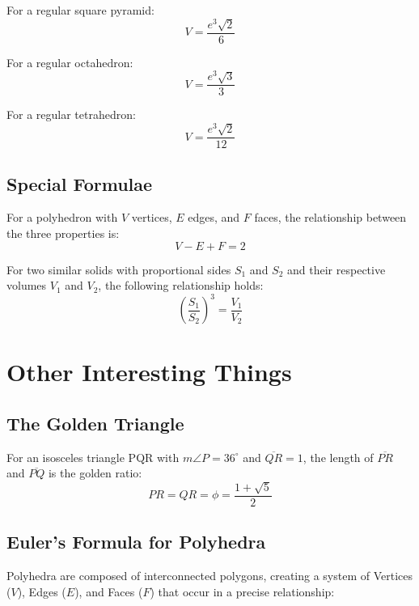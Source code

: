 \documentclass[final, letterpaper, 12pt]{article}
\begin{document}
		For a regular square pyramid:
		\begin{equation}
			V = \frac{e^3\sqrt{2}}{6}
		\end{equation}
		
		For a regular octahedron:
		\begin{equation}
			V = \frac{e^3\sqrt{3}}{3}
		\end{equation}
		
		For a regular tetrahedron:
		\begin{equation}
			V = \frac{e^3\sqrt{2}}{12}
		\end{equation}
	\subsection{Special Formulae}\label{sec: euler's formula for polyhedra and solid similarity}
		For a polyhedron with $V$ vertices, $E$ edges, and $F$ faces, the relationship between the three properties is:
		\begin{equation}
			V - E + F = 2
		\end{equation}
		
		For two similar solids with proportional sides $S_1$ and $S_2$ and their respective volumes $V_1$ and $V_2$, the following relationship holds:
		\begin{equation}
			\left( \frac{S_1}{S_2} \right) ^3 = \frac{V_1}{V_2}
		\end{equation}
		
\section{Other Interesting Things}
	\subsection{The Golden Triangle}\label{sec: 36-72-72 triangle and value of phi}
	For an isosceles triangle PQR with $m\angle P = 36 ^{\circ}$ and $\overline{QR} = 1$, the length of $\overline{PR}$ and $\overline{PQ}$ is the golden ratio:
		\begin{equation}
			PR = QR = \phi = \frac{1 + \sqrt{5}}{2}
		\end{equation}
	
	\subsection{Euler's Formula for Polyhedra}\label{sec: a relationship between vertices, edges, and faces in polyhedra}
		Polyhedra are composed of interconnected polygons, creating a system of Vertices ($V$), Edges ($E$), and Faces ($F$) that occur in a precise relationship:
		
\end{document}
